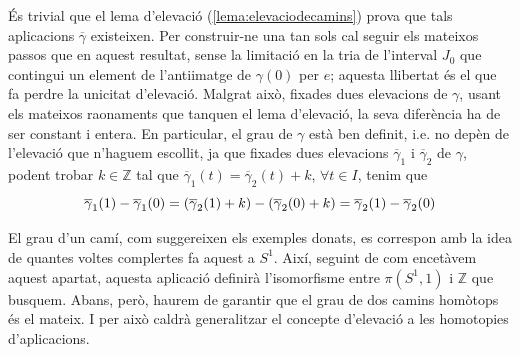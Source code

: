 \documentclass[../main.tex]{subfiles}
\begin{document}
És trivial que el lema d'elevació (\ref{lema:elevaciodecamins}) prova que tals aplicacions $\overline{\gamma}$ existeixen. Per construir-ne una tan sols cal seguir els mateixos passos que en aquest resultat, sense la limitació en la tria de l'interval $J_0$ que contingui un element de l'antiimatge de $\gamma(0)$ per $e$; aquesta llibertat és el que fa perdre la unicitat d'elevació. Malgrat això, fixades dues elevacions de $\gamma$, usant els mateixos raonaments que tanquen el lema d'elevació, la seva diferència ha de ser constant i entera. En particular, el grau de $\gamma$ està ben definit, i.e. no depèn de l'elevació que n'haguem escollit, ja que fixades dues elevacions $\overline{\gamma}_1$ i $\overline{\gamma}_2$ de $\gamma$, podent trobar $k\in\mathbb{Z}$ tal que $\overline{\gamma}_1(t) = \overline{\gamma}_2(t) + k$, $\forall t\in I$, tenim que
\begin{equation}
    \notag
    \overline{\gamma}_1(1)-\overline{\gamma}_1(0) = (\overline{\gamma}_2(1)+k) - (\overline{\gamma}_2(0)+k) = \overline{\gamma}_2(1)-\overline{\gamma}_2(0)
\end{equation}

El grau d'un camí, com suggereixen els exemples donats, es correspon amb la idea de quantes voltes complertes fa aquest a $S^1$. Així, seguint de com encetàvem aquest apartat, aquesta aplicació definirà l'isomorfisme entre $\pi(S^1,1)$ i $\mathbb{Z}$ que busquem. Abans, però, haurem de garantir que el grau de dos camins homòtops és el mateix. I per això caldrà generalitzar el concepte d'elevació a les homotopies d'aplicacions.
\end{document}
